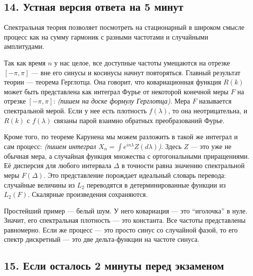 \documentclass[
  11pt,
  a4paper,
]{article}
\begin{document}
\subsection{14. Устная версия ответа на 5
минут}\label{ux443ux441ux442ux43dux430ux44f-ux432ux435ux440ux441ux438ux44f-ux43eux442ux432ux435ux442ux430-ux43dux430-5-ux43cux438ux43dux443ux442}

Спектральная теория позволяет посмотреть на стационарный в широком
смысле процесс как на сумму гармоник с разными частотами и случайными
амплитудами.

Так как время \(n\) у нас целое, все доступные частоты умещаются на
отрезке \([-\pi, \pi]\) --- вне его синусы и косинусы начнут
повторяться. Главный результат теории --- теорема Герглотца. Она
говорит, что ковариационная функция \(R(k)\) может быть представлена как
интеграл Фурье от некоторой конечной меры \(F\) на отрезке
\([-\pi, \pi]\): \emph{(пишем на доске формулу Герглотца)}. Мера \(F\)
называется спектральной мерой. Если у нее есть плотность \(f(\lambda)\),
то она неотрицательна, и \(R(k)\) с \(f(\lambda)\) связаны парой взаимно
обратных преобразований Фурье.

Кроме того, по теореме Карунена мы можем разложить в такой же интеграл и
сам процесс: \emph{(пишем интеграл
\(X_n = \int e^{in\lambda} Z(d\lambda)\))}. Здесь \(Z\) --- это уже не
обычная мера, а случайная функция множества с ортогональными
приращениями. Её дисперсия для любого интервала \(\Delta\) в точности
равна значению спектральной меры \(F(\Delta)\). Это представление
порождает идеальный словарь перевода: случайные величины из \(L_2\)
переводятся в детерминированные функции из \(L_2(F)\). Скалярные
произведения сохраняются.

Простейший пример --- белый шум. У него ковариация --- это ``иголочка''
в нуле. Значит, его спектральная плотность --- это константа. Все
частоты представлены равномерно. Если же процесс --- это просто синус со
случайной фазой, то его спектр дискретный --- это две дельта-функции на
частоте синуса.

\subsection{15. Если осталось 2 минуты перед
экзаменом}\label{ux435ux441ux43bux438-ux43eux441ux442ux430ux43bux43eux441ux44c-2-ux43cux438ux43dux443ux442ux44b-ux43fux435ux440ux435ux434-ux44dux43aux437ux430ux43cux435ux43dux43eux43c}
\end{document}
